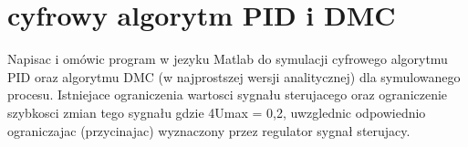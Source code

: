 \chapter{cyfrowy algorytm PID i DMC}
Napisac i omówic program w jezyku Matlab do symulacji cyfrowego algorytmu PID
oraz algorytmu DMC (w najprostszej wersji analitycznej) dla symulowanego procesu.
Istniejace ograniczenia wartosci sygnału sterujacego oraz ograniczenie szybkosci zmian
tego sygnału
gdzie 4Umax = 0,2, uwzglednic odpowiednio ograniczajac (przycinajac) wyznaczony
przez regulator sygnał sterujacy.